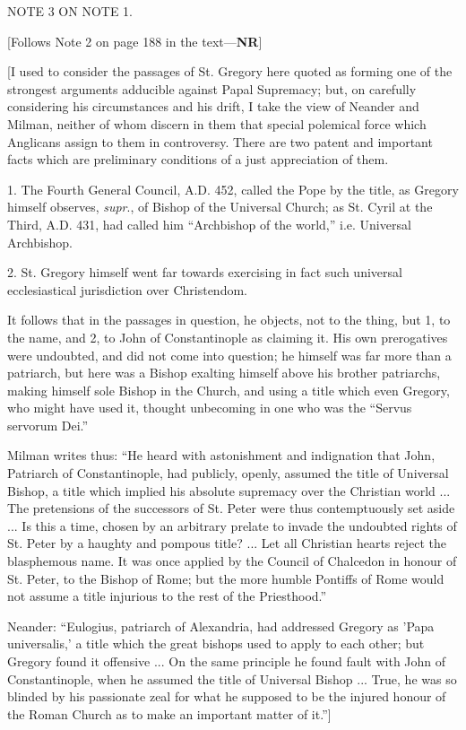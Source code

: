 {NOTE
3 ON NOTE
1.

[Follows Note 2 on page 188 in the text—\textbf{NR}]

[I used to consider the passages of St. Gregory here
quoted as forming one of the strongest arguments adducible against
Papal Supremacy; but, on carefully considering his circumstances and
his drift, I take the view of Neander and Milman, neither of whom
discern in them that special polemical force which Anglicans assign to
them in controversy. There are two patent and important facts which
are preliminary conditions of a just appreciation of them.

1. The Fourth General Council, A.D. 452, called the
Pope by the title, as Gregory himself observes, \emph{supr}., of
Bishop of the Universal Church; as St. Cyril at the Third, A.D. 431,
had called him ``Archbishop of the world,'' i.e. Universal
Archbishop.

2. St. Gregory himself went far towards exercising
in fact such universal ecclesiastical jurisdiction over Christendom.

It follows that in the passages in question, he
objects, not to the thing, but 1, to the name, and 2, to John of
Constantinople as claiming it. His own prerogatives were undoubted,
and did not come into question; he himself was far more than a
patriarch, but here was a Bishop exalting himself above his brother
patriarchs, making himself sole Bishop in the Church, and using a
title which even Gregory, who might have used it, thought unbecoming
in one who was the ``Servus servorum Dei.''

Milman writes thus: ``He heard with astonishment
and indignation that John, Patriarch of Constantinople, had publicly,
openly, assumed the title of Universal Bishop, a title which implied
his absolute supremacy over the Christian world ... The pretensions of
the successors of St. Peter were thus contemptuously set aside ... Is
this a time, chosen by an arbitrary prelate to invade the undoubted
rights of St. Peter by a haughty and pompous title? ... Let all
Christian hearts reject the blasphemous name. It was once applied by
the Council of Chalcedon in honour of St. Peter, to the Bishop of
Rome; but the more humble Pontiffs of Rome would not assume a title
injurious to the rest of the Priesthood.''

Neander: ``Eulogius, patriarch of Alexandria,
had addressed Gregory as 'Papa universalis,' a title which the great
bishops used to apply to each other; but Gregory found it offensive
... On the same principle he found fault with John of Constantinople,
when he assumed the title of Universal Bishop ... True, he was so
blinded by his passionate zeal for what he supposed to be the injured
honour of the Roman Church as to make an important matter of
it.'']}

